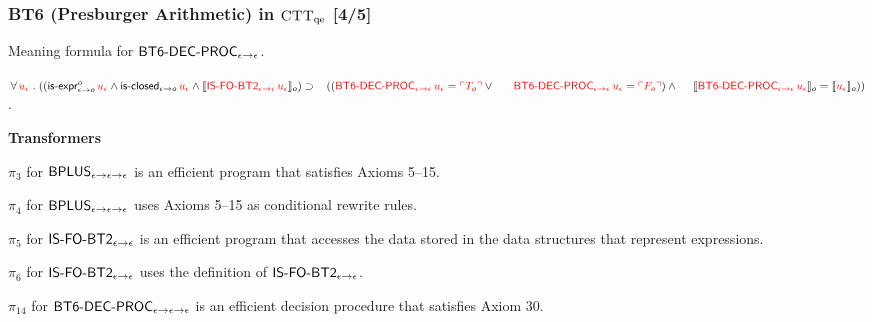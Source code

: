\documentclass[t,12pt,numbers,fleqn]{beamer}
\newcommand{\churchqe}{$\mbox{\sc CTT}_{\rm qe}$}
\newcommand{\syn}[1]{\textcolor{red}{#1}}
\begin{document}
\begin{frame}
\frametitle{BT6 (Presburger Arithmetic) in {\churchqe} [4/5]}
\small
\bi

  \item[]

  \be

    \setcounter{enumi}{29}

    \item Meaning formula for $\mbox{\sf BT6-DEC-PROC}_{\epsilon \rightarrow \epsilon}$.

    $\ForallApp \syn{u_\epsilon} \mdot 
    ((\mname{is-expr}_{\epsilon \tarrow o}^{o} \, 
    \syn{u_\epsilon}  \Andd
    \mname{is-closed}_{\epsilon \tarrow o} \, \syn{u_\epsilon} \Andd 
    \sembrack{\syn{\mname{IS-FO-BT2}_{\epsilon \tarrow \epsilon} \, 
    u_\epsilon}}_o) \Implies {}\newline
    \hspace*{2ex}((\syn{\mname{BT6-DEC-PROC}_{\epsilon \tarrow \epsilon} \, u_\epsilon} = 
    \syn{\synbrack{T_o}} \Orr {}\newline
    \hspace*{3.9ex}\syn{\mname{BT6-DEC-PROC}_{\epsilon \tarrow \epsilon} \, u_\epsilon} = 
    \syn{\synbrack{F_o}}) \Andd {}\newline
    \hspace*{3.1ex}
    \sembrack{\syn{\mname{BT6-DEC-PROC}_{\epsilon \tarrow \epsilon} \, u_\epsilon}}_o =
    \sembrack{\syn{u_\epsilon}}_o))$.

  \ee

  \item[] \textbf{Transformers}

  \be

    \setcounter{enumi}{2}

    \item $\pi_3$ for $\mbox{\sf BPLUS}_{\epsilon \rightarrow \epsilon
      \rightarrow \epsilon}$ is an efficient program that satisfies Axioms
      5--15.

    \item $\pi_4$ for $\mbox{\sf BPLUS}_{\epsilon \rightarrow \epsilon
      \rightarrow \epsilon}$ uses Axioms 5--15 as conditional rewrite
      rules.

    \item $\pi_5$ for $\mbox{\sf IS-FO-BT2}_{\epsilon \rightarrow
      \epsilon}$ is an efficient program that accesses the data
      stored in the data structures that represent expressions.

    \item $\pi_6$ for $\mbox{\sf IS-FO-BT2}_{\epsilon \rightarrow \epsilon}$
      uses the definition of $\mbox{\sf IS-FO-BT2}_{\epsilon \rightarrow
        \epsilon}$.

    \setcounter{enumi}{13}

    \item $\pi_{14}$ for $\mbox{\sf BT6-DEC-PROC}_{\epsilon \rightarrow
      \epsilon \rightarrow \epsilon}$ is an efficient decision procedure
      that satisfies Axiom 30.

  \ee

\ei
\end{frame}
\end{document}
